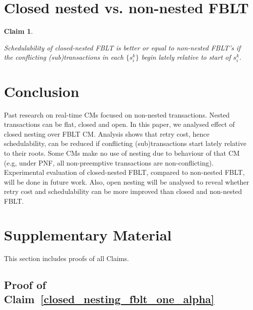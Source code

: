 \documentclass[letter]{sig-alternate}
\newtheorem{clm}{Claim}
\begin{document}
\section{Closed nested vs. non-nested FBLT}\label{sec:schedulabiltiy comparison}

\begin{clm}\label{clm:closed_nested_non_nested_fblt_schedulabiltiy_comp}

Schedulability of closed-nested FBLT is better or equal to non-nested
FBLT's if the conflicting (sub)transactions in each $\{s_{i}^{k}\}$
begin lately relative to start of $s_{i}^{k}$.

\end{clm}

\section{Conclusion}\label{sec:conclusion}

Past research on real-time CMs focused on non-nested transactions. Nested transactions can be flat, closed and open. In this paper, we analysed effect of closed nesting over FBLT CM. Analysis shows that retry cost, hence schedulability, can be reduced if conflicting (sub)transactions start lately relative to their roots. Some CMs make no use of nesting due to behaviour of that CM (e.g, under PNF, all non-preemptive transactions are non-conflicting). Experimental evaluation of closed-nested FBLT, compared to non-nested FBLT, will be done in future work. Also, open nesting will be analysed to reveal whether retry cost and schedulability can be more improved than closed and non-nested FBLT. 


\small{}
\normalsize

\renewcommand{\thesubsection}{S.\arabic{subsection}}

\section*{Supplementary Material}

This section includes proofs of all Claims.
\subsection{\label{proof_closed_nesting_fblt_one_alpha}Proof of Claim~\ref{closed_nesting_fblt_one_alpha}}
\end{document}
